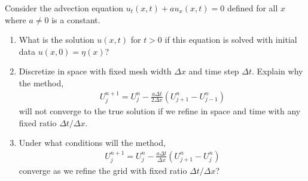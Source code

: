 \documentclass[10pt]{article}
\begin{document}
\begin{problem}
    Consider the advection equation \( u_t(x,t) + au_x(x,t) = 0 \) defined for all \( x \) where \( a\neq 0 \) is a constant.
    \begin{enumerate}[label=(\alph*),nolistsep]
        \item What is the solution \( u(x,t) \) for \( t > 0 \) if this equation is solved with initial data \( u(x,0) = \eta(x) \)?
        \item Discretize in space with fixed mesh width \( \Delta x \) and time step \( \Delta t \). Explain why the method,
            \begin{align*}
                U_j^{n+1} = U_j^n - \frac{a\Delta t}{2\Delta x}(U_{j+1}^n - U_{j-1}^n)
            \end{align*}
            will not converge to the true solution if we refine in space and time with any fixed ratio \( \Delta t / \Delta x \).
        \item Under what conditions will the method,
            \begin{align*}
                U_j^{n+1} = U_j^n - \frac{a\Delta t}{\Delta x} (U_{j+1}^n-U_j^n)
            \end{align*}
        converge as we refine the grid with fixed ratio \( \Delta t / \Delta x \)?
    \end{enumerate}
\end{problem}
\end{document}
